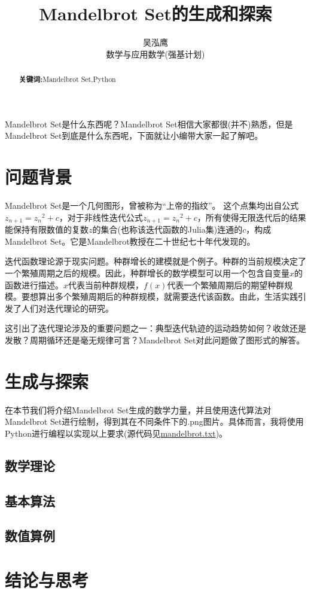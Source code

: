\documentclass[a4paper]{ctexart}
\author{吴泓鹰\\数学与应用数学(强基计划)\quad3210101890}
\title{Mandelbrot Set的生成和探索}
\begin{document}
\maketitle	

\begin{abstract}
	\textbf{关键词:}Mandelbrot Set,Python
\end{abstract}	

Mandelbrot Set是什么东西呢？Mandelbrot Set相信大家都很(并不)熟悉，但是Mandelbrot Set到底是什么东西呢，下面就让小编带大家一起了解吧。

\section{问题背景}
Mandelbrot Set是一个几何图形，曾被称为“上帝的指纹”。 这个点集均出自公式$z_{n+1}={z_n}^2+c$，对于非线性迭代公式$z_{n+1}={z_n}^2+c$，所有使得无限迭代后的结果能保持有限数值的复数$z$的集合(也称该迭代函数的Julia集)连通的$c$，构成Mandelbrot Set。它是Mandelbrot教授在二十世纪七十年代发现的。\cite{mandelbrotsetbaidu}

迭代函数理论源于现实问题。种群增长的建模就是个例子。种群的当前规模决定了一个繁殖周期之后的规模。因此，种群增长的数学模型可以用一个包含自变量$x$的函数进行描述。$x$代表当前种群规模，$f(x)$代表一个繁殖周期后的期望种群规模。要想算出多个繁殖周期后的种群规模，就需要迭代该函数。由此，生活实践引发了人们对迭代理论的研究。

这引出了迭代理论涉及的重要问题之一：典型迭代轨迹的运动趋势如何？收敛还是发散？周期循环还是毫无规律可言？Mandelbrot Set对此问题做了图形式的解答。\cite{mandelbrotsetzhihu}

\section{生成与探索}
在本节我们将介绍Mandelbrot Set生成的数学力量，并且使用迭代算法对Mandelbrot Set进行绘制，得到其在不同条件下的.png图片。具体而言，我将使用Python进行编程以实现以上要求(源代码见\href{run:./code/py/mandelbrot.txt}{mandelbrot.txt})\cite{mandelbrotsetpython}。
\subsection{数学理论}

\subsection{基本算法}

\subsection{数值算例}

\section{结论与思考}
	
	
	


	
\end{document}
